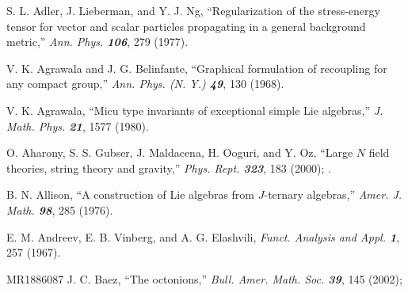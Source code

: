  S. L. Adler, J. Lieberman, and Y. J. Ng,
``Regularization of the stress-energy tensor for vector and scalar particles
propagating in a general background metric,''
{\em Ann. Phys. \bf 106}, 279 (1977).

V. K. Agrawala and J. G. Belinfante,
``Graphical formulation of recoupling for any compact group,''
{\em Ann.  Phys.  (N. Y.) \bf 49}, 130 (1968).

V. K. Agrawala,
``Micu type invariants of exceptional simple Lie algebras,''
{\em J. Math. Phys.  \bf 21}, 1577 (1980).

O. Aharony, S. S. Gubser, J. Maldacena, H. Ooguri, and Y. Oz,
``Large $N$ field theories, string theory and gravity,''
{\em Phys. Rept.  \bf 323}, 183 (2000);
.


 B. N. Allison,
        ``A construction of Lie algebras from $J$-ternary algebras,''
        {\em Amer. J. Math. \bf 98}, 285 (1976).  %

    E. M. Andreev, E. B. Vinberg, and A. G. Elashvili,
    {\em Funct. Analysis and Appl.  \bf 1}, 257 (1967).

%



        {MR1886087} J. C. Baez,
    ``The octonions,''
    {\em Bull. Amer. Math. Soc.  \bf 39}, 145 (2002); %



